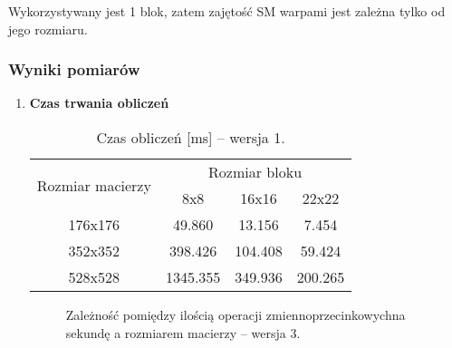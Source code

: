 Wykorzystywany jest 1 blok, zatem zajętość SM warpami jest zależna tylko od jego rozmiaru.

\newpage
\subsubsection{Wyniki pomiarów}

\begin{enumerate}

\item \textbf{Czas trwania obliczeń} \newline
\begin{table}[H]
\centering
\begin{tabular}{|c|c|c|c|}
\hline
\multirow{2}{*}{Rozmiar macierzy} & \multicolumn{3}{c|}{Rozmiar bloku} \\ \cline{2-4}
& 8x8 & 16x16 & 22x22 \\ \hline
176x176 & 49.860 & 13.156 & 7.454 \\ \hline
352x352 & 398.426 & 104.408 & 59.424 \\ \hline
528x528 & 1345.355 & 349.936 & 200.265 \\ \hline
\end{tabular}
\caption{Czas obliczeń [ms] -- wersja 1.}
\end{table}

\begin{figure}[H]
\centering
\caption{Zależność pomiędzy ilością operacji zmiennoprzecinkowychna sekundę a rozmiarem macierzy -- wersja 3.}
\end{figure}


\end{enumerate}
